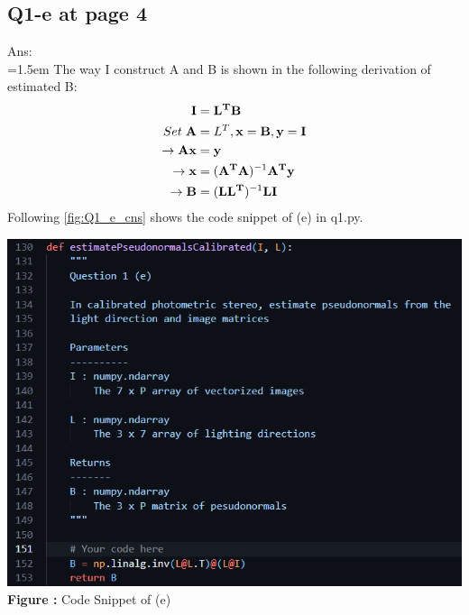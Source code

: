\documentclass{article}
\begin{document}
	\newpage
	\subsection*{Q1-e at page 4}
	Ans:\\
	\hangindent=1.5em \hspace{1.5em} The way I construct A and B is shown in the following derivation of estimated B:
	\begin{align}
		\mathbf{I} &= \mathbf{L^{T}}\mathbf{B} \\
		Set \hspace{1mm} \mathbf{A} &= L^{T}, \mathbf{x} = \mathbf{B}, \mathbf{y} = \mathbf{I} \\
		\rightarrow \mathbf{A}\mathbf{x} &= \mathbf{y} \\
		\rightarrow \mathbf{x} &= (\mathbf{A^T}\mathbf{A})^{-1}\mathbf{A^T}\mathbf{y} \\
		\rightarrow \mathbf{B} &= (\mathbf{L}\mathbf{L^T})^{-1}\mathbf{L}\mathbf{I} 
	\end{align}
	Following \autoref{fig:Q1_e_cns} shows the code snippet of (e) in q1.py.
	\newline
	
	\begin{minipage}{1\linewidth}
	\centering
	\includegraphics[width=0.5\columnwidth, height=0.4\linewidth]{./Q1_e_cns.png}
	  \\%
	\textbf{Figure \thefigure:} Code Snippet of (e)  %
	\label{fig:Q1_e_cns}         %
	\end{minipage}	
	
	\newpage
\end{document}
